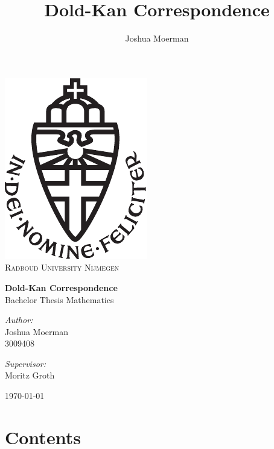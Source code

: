 \documentclass[titlepage, 11pt]{amsproc}
\title{Dold-Kan Correspondence}
\author{Joshua Moerman}
\theoremstyle{plain}
\theoremstyle{definition}
\begin{document}
\begin{titlepage}
\centering
\vspace{10cm}

\includegraphics[scale=0.2]{ru}\\
\textsc{Radboud University Nijmegen}
\vspace{3cm}

{\huge \bfseries Dold-Kan Correspondence}\\
Bachelor Thesis Mathematics
\vspace{3cm}

\begin{minipage}{0.4\textwidth}
\begin{flushleft} \large
\emph{Author:}\\
Joshua Moerman\\
3009408
\end{flushleft}
\end{minipage}
\begin{minipage}{0.4\textwidth}
\begin{flushright} \large
\emph{Supervisor:} \\
Moritz Groth
\end{flushright}
\end{minipage}

\vfill
\today

\end{titlepage}

\section*{Contents}
\renewcommand\contentsname{}
\tableofcontents
\end{document}
